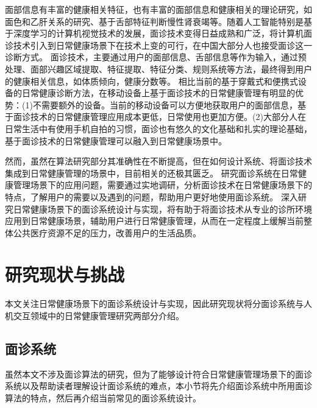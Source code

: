 
面部信息有丰富的健康相关特征\cite{ding2019reading}，也有丰富的面部信息和健康相关的理论研究，如面色和乙肝关系的研究\cite{吴秀艳2014108}、基于舌部特征判断慢性肾衰竭\cite{周小芳2018慢性肾衰患者虚兼湿浊证的口唇特征研究}等。随着人工智能特别是基于深度学习的计算机视觉技术\cite{hassaballah2020deep}的发展，面诊技术变得日益成熟和广泛，将计算机面诊技术引入到日常健康场景下在技术上变的可行，在中国大部分人也接受面诊这一诊断方式。
面诊技术，主要通过用户的面部信息、舌部信息等作为输入，通过预处理、面部兴趣区域提取、特征提取、特征分类、规则系统等方法，最终得到用户的健康相关信息，如体质倾向，健康分数等\cite{林锋2019中医面诊系统调研报告}。
相比当前的基于穿戴式和便携式设备的日常健康诊断方法，在移动设备上基于面诊技术的日常健康管理有明显的优势：(1)不需要额外的设备。当前的移动设备可以方便地获取用户的面部信息，基于面诊技术的日常健康管理应用成本更低，日常使用也更加方便。(2)大部分人在日常生活中有使用手机自拍的习惯，面诊也有悠久的文化基础和扎实的理论基础，基于面诊技术的日常健康管理可以融入到日常健康场景中。

然而，虽然在算法研究部分其准确性在不断提高，但在如何设计系统、将面诊技术集成到日常健康管理的场景中，目前相关的还极其匮乏。
研究面诊系统在日常健康管理场景下的应用问题，需要通过实地调研，分析面诊技术在日常健康场景下的特点，了解用户的需要以及遇到的问题，帮助用户更好地使用面诊系统。
深入研究日常健康场景下的面诊系统设计与实现，将有助于将面诊技术从专业的诊所环境应用到日常健康场景，辅助用户进行日常健康管理，从而在一定程度上缓解当前整体公共医疗资源不足的压力，改善用户的生活品质。

\section{研究现状与挑战}
本文关注日常健康场景下的面诊系统设计与实现，因此研究现状将分面诊系统与人机交互领域中的日常健康管理研究两部分介绍。

\subsection{面诊系统}
虽然本文不涉及面诊算法的研究，但为了能够设计符合日常健康管理场景下的面诊系统以及帮助读者理解设计面诊系统的难点，本小节将先介绍面诊系统中所用面诊算法的特点，然后再介绍当前常见的面诊系统设计。

